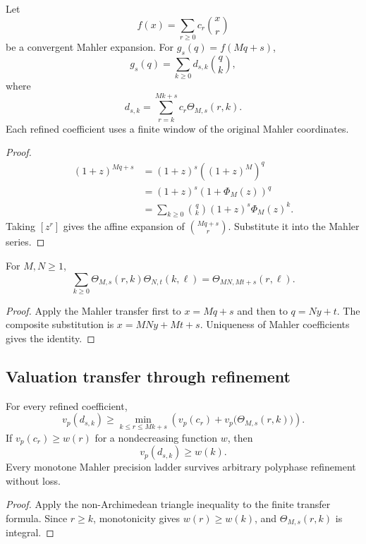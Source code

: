 \begin{theorem}
Let
\[
 f(x)=\sum_{r\geq0}c_r\binom xr
\]
be a convergent Mahler expansion. For $g_s(q)=f(Mq+s)$,
\[
 \boxed{g_s(q)=\sum_{k\geq0}d_{s,k}\binom qk,}
\]
where
\[
 \boxed{d_{s,k}=\sum_{r=k}^{Mk+s}c_r\Theta_{M,s}(r,k).}
\]
Each refined coefficient uses a finite window of the original Mahler coordinates.
\end{theorem}

\begin{proof}
\[
 \begin{aligned}
 (1+z)^{Mq+s}
 &=(1+z)^s\left((1+z)^M\right)^q\\
 &=(1+z)^s(1+\Phi_M(z))^q\\
 &=\sum_{k\geq0}\binom qk(1+z)^s\Phi_M(z)^k.
 \end{aligned}
\]
Taking $[z^r]$ gives the affine expansion of $\binom{Mq+s}{r}$. Substitute it into the Mahler series.
\end{proof}

\begin{theorem}
For $M,N\geq1$,
\[
 \boxed{\sum_{k\geq0}\Theta_{M,s}(r,k)\Theta_{N,t}(k,\ell)=\Theta_{MN,Mt+s}(r,\ell).}
\]
\end{theorem}

\begin{proof}
Apply the Mahler transfer first to $x=Mq+s$ and then to $q=Ny+t$. The composite substitution is $x=MNy+Mt+s$. Uniqueness of Mahler coefficients gives the identity.
\end{proof}

\subsection{Valuation transfer through refinement}
\begin{theorem}
For every refined coefficient,
\[
 \boxed{v_p(d_{s,k})\geq\min_{k\leq r\leq Mk+s}\left(v_p(c_r)+v_p\bigl(\Theta_{M,s}(r,k)\bigr)\right).}
\]
If $v_p(c_r)\geq w(r)$ for a nondecreasing function $w$, then
\[
 \boxed{v_p(d_{s,k})\geq w(k).}
\]
Every monotone Mahler precision ladder survives arbitrary polyphase refinement without loss.
\end{theorem}

\begin{proof}
Apply the non-Archimedean triangle inequality to the finite transfer formula. Since $r\geq k$, monotonicity gives $w(r)\geq w(k)$, and $\Theta_{M,s}(r,k)$ is integral.
\end{proof}

